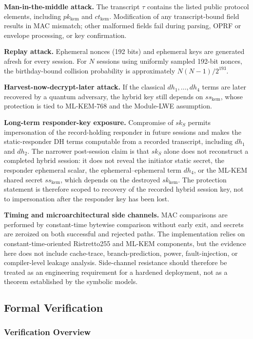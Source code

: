 \documentclass[preprint,12pt]{elsarticle}
\theoremstyle{remark}
\begin{document}
\textbf{Man-in-the-middle attack.} The transcript $\tau$ contains the
listed public protocol elements, including $pk_{\mathrm{kem}}$ and
$ct_{\mathrm{kem}}$. Modification of any transcript-bound field results
in MAC mismatch; other malformed fields fail during parsing, OPRF or
envelope processing, or key confirmation.

\textbf{Replay attack.} Ephemeral nonces (192 bits) and ephemeral keys
are generated afresh for every session. For $N$ sessions using uniformly
sampled 192-bit nonces, the birthday-bound collision probability is
approximately $N(N-1)/2^{193}$.

\textbf{Harvest-now-decrypt-later attack.} If the classical
$dh_1,\ldots,dh_4$ terms are later recovered by a quantum adversary, the
hybrid key still depends on $ss_{\mathrm{kem}}$, whose protection is tied
to ML-KEM-768 and the Module-LWE assumption.

\textbf{Long-term responder-key exposure.} Compromise of $sk_S$ permits
impersonation of the record-holding responder in future sessions and makes the
static-responder DH terms computable from a recorded transcript, including
$dh_1$ and $dh_2$. The narrower post-session claim is that $sk_S$ alone
does not reconstruct a completed hybrid session: it does not reveal the
initiator static secret, the responder ephemeral scalar, the
ephemeral--ephemeral term $dh_4$, or the ML-KEM shared secret
$ss_{\mathrm{kem}}$, which depends on the destroyed
$sk_{\mathrm{kem}}$. The protection statement is therefore scoped to
recovery of the recorded hybrid session key, not to impersonation after
the responder key has been lost.

\textbf{Timing and microarchitectural side channels.} MAC comparisons
are performed by constant-time bytewise comparison without early exit,
and secrets are zeroized on both successful and rejected paths. The
implementation relies on constant-time-oriented Ristretto255 and ML-KEM
components, but the evidence here does not include cache-trace,
branch-prediction, power, fault-injection, or compiler-level leakage
analysis. Side-channel resistance should therefore be treated as an
engineering requirement for a hardened deployment, not as a theorem
established by the symbolic models.

\subsection{Formal Verification}

\subsubsection{Verification Overview}
\end{document}
